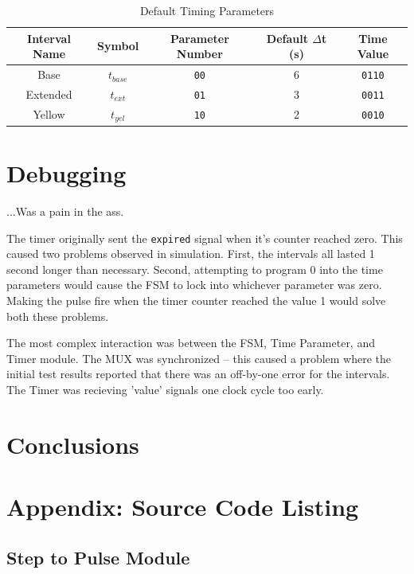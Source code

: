 \documentclass{article}
\begin{document}
	\begin{table}
	\centering
		\begin{tabular}{|c|c|c|c|c|}
		\hline
		Interval Name & Symbol & Parameter Number & Default $\Delta$t (s) & Time Value \\ \hline
		Base & $t_{base}$ & \texttt{00} & 6 & \texttt{0110} \\ \hline
		Extended & $t_{ext}$ & \texttt{01} & 3 & \texttt{0011} \\ \hline
		Yellow & $t_{yel}$ & \texttt{10} & 2 & \texttt{0010} \\ \hline
		\end{tabular}
	\caption{Default Timing Parameters}
	\label{tbl:timeparam}
	\end{table}


\section{Debugging}
	...Was a pain in the ass.

	The timer originally sent the \texttt{expired} signal when it's counter
	reached zero.  This caused two problems observed in simulation.  First,
	the intervals all lasted 1 second longer than necessary.  Second, attempting
	to program 0 into the time parameters would cause the FSM to lock into whichever
	parameter was zero.  Making the pulse fire when the timer counter reached
	the value 1 would solve both these problems.

	The most complex interaction was between the FSM, Time Parameter, and
	Timer module.  The MUX was synchronized -- this caused a problem where
	the initial test results reported that there was an off-by-one error
	for the intervals.  The Timer was recieving 'value' signals one clock
	cycle too early.

\section{Conclusions}

\newpage
\section{Appendix: Source Code Listing}
	\subsection{Step to Pulse Module}
		\begin{lgrind}
		
		\end{lgrind}
\end{document}

